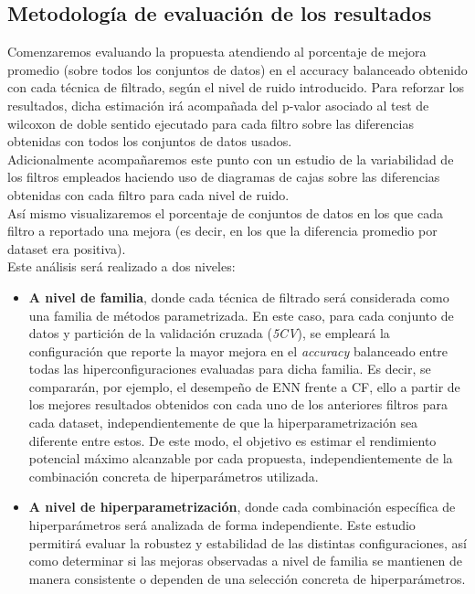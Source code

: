 \documentclass[print, color]{ugrTFG}
\begin{document}
    \subsection{Metodología de evaluación de los resultados}
    Comenzaremos evaluando la propuesta atendiendo al porcentaje de mejora promedio (sobre todos los conjuntos de datos) en el accuracy balanceado obtenido con cada técnica de filtrado, según el nivel de ruido introducido. Para reforzar los resultados, dicha estimación irá acompañada del p-valor asociado al test de wilcoxon de doble sentido ejecutado para cada filtro sobre las diferencias obtenidas con todos los conjuntos de datos usados.\\
    Adicionalmente acompañaremos este punto con un estudio de la variabilidad de los filtros empleados haciendo uso de diagramas de cajas sobre las diferencias obtenidas con cada filtro para cada nivel de ruido.\\
    Así mismo visualizaremos el porcentaje de conjuntos de datos en los que cada filtro a reportado una mejora (es decir, en los que la diferencia promedio por dataset era positiva).\\
    Este análisis será realizado a dos niveles:
        \begin{itemize}
            \item \textbf{A nivel de familia}, donde cada técnica de filtrado será considerada como una familia de métodos parametrizada. En este caso, para cada conjunto de datos y partición de la validación cruzada (\textit{5CV}), se empleará la configuración que reporte la mayor mejora en el \textit{accuracy} balanceado entre todas las hiperconfiguraciones evaluadas para dicha familia. Es decir, se compararán, por ejemplo, el desempeño de ENN frente a CF, ello a partir de los mejores resultados obtenidos con cada uno de los anteriores filtros para cada dataset, independientemente de que la hiperparametrización sea diferente entre estos. De este modo, el objetivo es estimar el rendimiento potencial máximo alcanzable por cada propuesta, independientemente de la combinación concreta de hiperparámetros utilizada.
            
            \item \textbf{A nivel de hiperparametrización}, donde cada combinación específica de hiperparámetros será analizada de forma independiente. Este estudio permitirá evaluar la robustez y estabilidad de las distintas configuraciones, así como determinar si las mejoras observadas a nivel de familia se mantienen de manera consistente o dependen de una selección concreta de hiperparámetros.
        \end{itemize}
\end{document}
